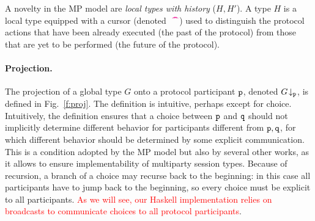 \documentclass[runningheads,plain]{llncs}
\newcommand{\checkthis}[1]{\textcolor{red}{#1}}
\begin{document}
 A novelty in the MP model are \emph{local types with history}  ($H, H'$). A type $H$ is a local type equipped with a
 cursor (denoted~$\,\textcolor{magenta}{\text{\textbf{\textasciicircum\!\!\textasciicircum}}}$) used to distinguish  the  protocol actions  that have been already executed (the past of the protocol) from those that are yet to be performed (the future of the protocol).
 
 \paragraph{Projection.}
The projection of a global type $G$ onto a protocol participant $\mathtt{p}$, denoted $G\!\downarrow_{\mathtt{p}}$,  is defined in Fig.~\ref{f:proj}. 
 The definition is intuitive, perhaps except for choice.
 Intuitively, the definition ensures that a choice between $\mathtt{p}$ and $\mathtt{q}$ should not implicitly determine different behavior for participants different from $\mathtt{p}, \mathtt{q}$, for which different behavior should  be determined by some explicit communication.
 This is a condition adopted by the MP model but also by several other works, as it allows to ensure implementability of  multiparty session types.
 Because of recursion, a branch of a choice may recurse back to the beginning: in this case
 all participants have to jump back to the beginning,
so every choice must  be explicit  to all participants.
\checkthis{As we will see, our Haskell implementation relies on broadcasts to communicate choices to all protocol participants}. 
\end{document}
